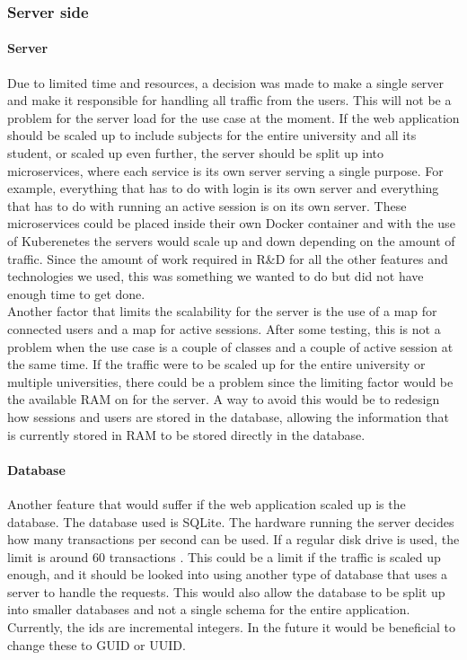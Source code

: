 \subsubsection{Server side}
\paragraph{Server}
Due to limited time and resources, a decision was made to make a single server and make it responsible for handling all traffic from the users. This will not be a problem for the server load for the use case at the moment. If the web application should be scaled up to include subjects for the entire university and all its student, or scaled up even further, the server should be split up into microservices, where each service is its own server serving a single purpose. For example, everything that has to do with login is its own server and everything that has to do with running an active session is on its own server. These microservices could be placed inside their own Docker\cite{Docker:Info} container and with the use of Kuberenetes\cite{Kubernetes:Info} the servers would scale up and down depending on the amount of traffic. Since the amount of work required in R\&D for all the other features and technologies we used, this was something we wanted to do but did not have enough time to get done.
\\[11pt]
Another factor that limits the scalability for the server is the use of a map for connected users and a map for active sessions. After some testing, this is not a problem when the use case is a couple of classes and a couple of active session at the same time. If the traffic were to be scaled up for the entire university or multiple universities, there could be a problem since the limiting factor would be the available RAM on for the server. A way to avoid this would be to redesign how sessions and users are stored in the database, allowing the information that is currently stored in RAM to be stored directly in the database. 
\paragraph{Database}
Another feature that would suffer if the web application scaled up is the database. The database used is SQLite. The hardware running the server decides how many transactions per second can be used. If a regular disk drive is used, the limit is around 60 transactions \cite{SQLite:faqQ19}. This could be a limit if the traffic is scaled up enough, and it should be looked into using another type of database that uses a server to handle the requests. This would also allow the database to be split up into smaller databases and not a single schema for the entire application. Currently, the ids are incremental integers. In the future it would be beneficial to change these to GUID or UUID.\cite{UUIDE}